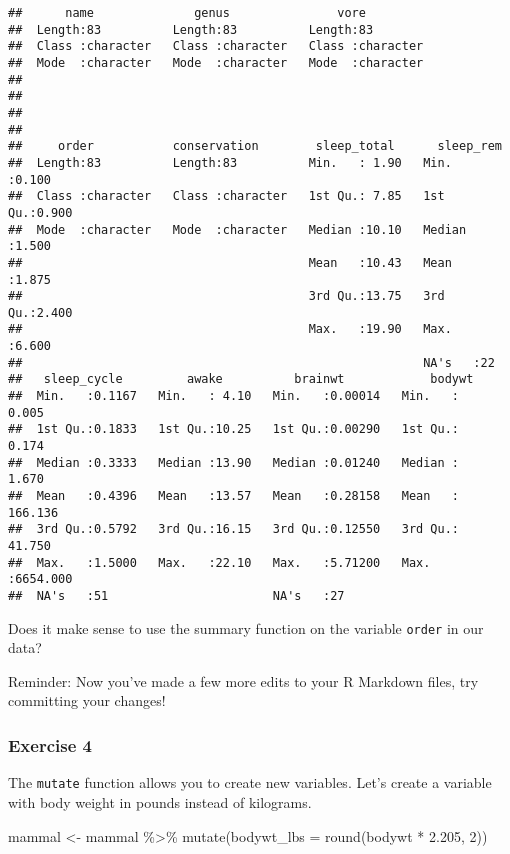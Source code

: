 \documentclass[]{article}
\newenvironment{Shaded}{\begin{snugshade}}{\end{snugshade}}
\newcommand{\AttributeTok}[1]{\textcolor[rgb]{0.77,0.63,0.00}{#1}}
\newcommand{\DecValTok}[1]{\textcolor[rgb]{0.00,0.00,0.81}{#1}}
\newcommand{\FloatTok}[1]{\textcolor[rgb]{0.00,0.00,0.81}{#1}}
\newcommand{\FunctionTok}[1]{\textcolor[rgb]{0.00,0.00,0.00}{#1}}
\newcommand{\NormalTok}[1]{#1}
\newcommand{\OtherTok}[1]{\textcolor[rgb]{0.56,0.35,0.01}{#1}}
\newcommand{\SpecialCharTok}[1]{\textcolor[rgb]{0.00,0.00,0.00}{#1}}
\begin{document}
\begin{verbatim}
##      name              genus               vore          
##  Length:83          Length:83          Length:83         
##  Class :character   Class :character   Class :character  
##  Mode  :character   Mode  :character   Mode  :character  
##                                                          
##                                                          
##                                                          
##                                                          
##     order           conservation        sleep_total      sleep_rem    
##  Length:83          Length:83          Min.   : 1.90   Min.   :0.100  
##  Class :character   Class :character   1st Qu.: 7.85   1st Qu.:0.900  
##  Mode  :character   Mode  :character   Median :10.10   Median :1.500  
##                                        Mean   :10.43   Mean   :1.875  
##                                        3rd Qu.:13.75   3rd Qu.:2.400  
##                                        Max.   :19.90   Max.   :6.600  
##                                                        NA's   :22     
##   sleep_cycle         awake          brainwt            bodywt        
##  Min.   :0.1167   Min.   : 4.10   Min.   :0.00014   Min.   :   0.005  
##  1st Qu.:0.1833   1st Qu.:10.25   1st Qu.:0.00290   1st Qu.:   0.174  
##  Median :0.3333   Median :13.90   Median :0.01240   Median :   1.670  
##  Mean   :0.4396   Mean   :13.57   Mean   :0.28158   Mean   : 166.136  
##  3rd Qu.:0.5792   3rd Qu.:16.15   3rd Qu.:0.12550   3rd Qu.:  41.750  
##  Max.   :1.5000   Max.   :22.10   Max.   :5.71200   Max.   :6654.000  
##  NA's   :51                       NA's   :27
\end{verbatim}

Does it make sense to use the summary function on the variable
\texttt{order} in our data?

Reminder: Now you've made a few more edits to your R Markdown files, try
committing your changes!

\hypertarget{exercise-4}{%
\subsubsection{Exercise 4}\label{exercise-4}}

The \texttt{mutate} function allows you to create new variables. Let's
create a variable with body weight in pounds instead of kilograms.

\begin{Shaded}
\begin{Highlighting}[]
\NormalTok{mammal }\OtherTok{\textless{}{-}}\NormalTok{ mammal }\SpecialCharTok{\%\textgreater{}\%}
  \FunctionTok{mutate}\NormalTok{(}\AttributeTok{bodywt\_lbs =} \FunctionTok{round}\NormalTok{(bodywt }\SpecialCharTok{*} \FloatTok{2.205}\NormalTok{, }\DecValTok{2}\NormalTok{))}
\end{Highlighting}
\end{Shaded}
\end{document}
